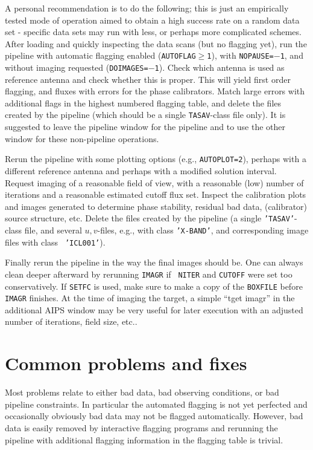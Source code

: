 A personal recommendation is to do the following; this is just an
empirically tested mode of operation aimed to obtain a high success
rate on a random data set - specific data sets may run with less, or
perhaps more complicated schemes. After loading and quickly inspecting
the data scans (but no flagging yet), run the pipeline with automatic
flagging enabled ({\tt AUTOFLAG$\ge$1}), with {\tt NOPAUSE=$-$1}, and
without imaging requested ({\tt DOIMAGES=$-$1}). Check which antenna is
used as reference antenna and check whether this is proper. This will
yield first order flagging, and fluxes with errors for the phase
calibrators.  Match large errors with additional flags in the highest
numbered flagging table, and delete the files created by the pipeline
(which should be a single {\tt TASAV}-class file only). It is
suggested to leave the pipeline window for the pipeline and to use the
other window for these non-pipeline operations.

Rerun the pipeline with some plotting options (e.g., {\tt AUTOPLOT=2}),
perhaps with a different reference antenna and perhaps with a modified
solution interval. Request imaging of a reasonable field of view, with
a reasonable (low) number of iterations and a reasonable estimated
cutoff flux set. Inspect the calibration plots and images generated to
determine phase stability, residual bad data, (calibrator) source
structure, etc. Delete the files created by the pipeline (a single
{\tt 'TASAV'}-class file, and several $u,v$-files, e.g., with class
{\tt 'X-BAND'}, and corresponding image files with class {\tt
'ICL001'}).

Finally rerun the pipeline in the way the final images should be. One
can always clean deeper afterward by rerunning {\tt IMAGR} if {\tt
NITER} and {\tt CUTOFF} were set too conservatively. If {\tt SETFC} is
used, make sure to make a copy of the {\tt BOXFILE} before {\tt IMAGR}
finishes. At the time of imaging the target, a simple ``tget imagr'' in
the additional AIPS window may be very useful for later execution with
an adjusted number of iterations, field size, etc..

\section{Common problems and fixes}
Most problems relate to either bad data, bad observing conditions, or
bad pipeline constraints. In particular the automated flagging is not
yet perfected and occasionally obviously bad data may not be flagged
automatically. However, bad data is easily removed by interactive
flagging programs and rerunning the pipeline with additional flagging
information in the flagging table is trivial.


